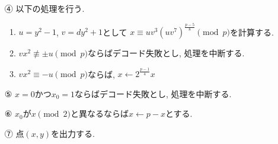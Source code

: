 \begin{enumerate}
\begin{enumerate}
    \item[④　] 以下の処理を行う.
    \begin{enumerate}
      \item $u=y^2-1$, $v=dy^2+1$として
      $x\equiv uv^3(uv^7)^{\tfrac{p-5}{8}}\pmod p$を計算する.
      \item $vx^2 \not\equiv \pm  u \pmod p$ならばデコード失敗とし, 処理を中断する.
      \item $vx^2\equiv -u \pmod p$ならば, $x\leftarrow 2^{\tfrac{p-1}{4}}x$
    \end{enumerate}
    \item[⑤　] $x=0$かつ$x_0=1$ならばデコード失敗とし, 処理を中断する.
    \item[⑥　] $x_0$が$x \pmod 2$と異なるならば$x\leftarrow p-x$とする.
    \item[⑦　] 点$(x,y)$を出力する.
  \end{enumerate}
\end{enumerate}

